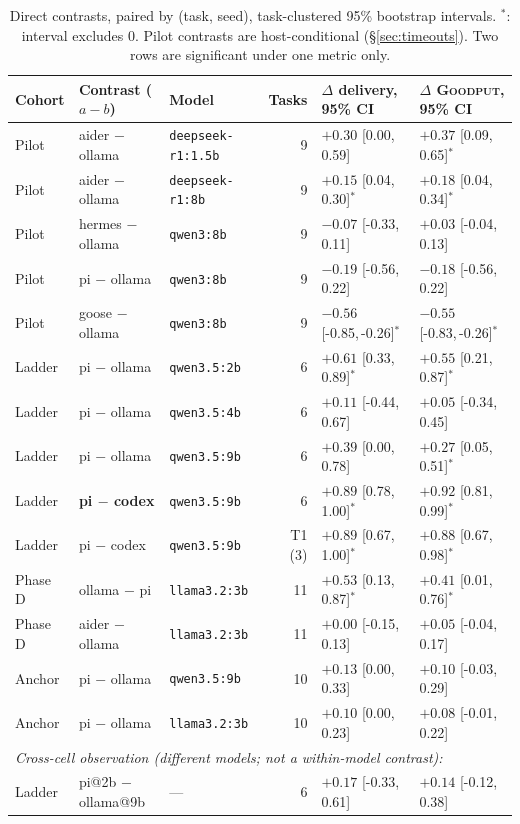 \documentclass[10pt]{article}
\newcommand{\goodput}{\textsc{Goodput}}
\newcommand{\ci}[2]{[#1,\,#2]}
\begin{document}
\begin{table}[t]
\centering\small
\begin{tabular}{lllrll}
\toprule
Cohort & Contrast ($a-b$) & Model & Tasks & $\Delta$ delivery, 95\% CI & $\Delta$ \goodput{}, 95\% CI\\
\midrule
Pilot & aider $-$ ollama & \texttt{deepseek-r1:1.5b} & 9 & $+0.30$ \ci{0.00}{0.59} & $+0.37$ \ci{0.09}{0.65}$^{*}$\\
Pilot & aider $-$ ollama & \texttt{deepseek-r1:8b} & 9 & $+0.15$ \ci{0.04}{0.30}$^{*}$ & $+0.18$ \ci{0.04}{0.34}$^{*}$\\
Pilot & hermes $-$ ollama & \texttt{qwen3:8b} & 9 & $-0.07$ \ci{-0.33}{0.11} & $+0.03$ \ci{-0.04}{0.13}\\
Pilot & pi $-$ ollama & \texttt{qwen3:8b} & 9 & $-0.19$ \ci{-0.56}{0.22} & $-0.18$ \ci{-0.56}{0.22}\\
Pilot & goose $-$ ollama & \texttt{qwen3:8b} & 9 & $-0.56$ \ci{-0.85}{-0.26}$^{*}$ & $-0.55$ \ci{-0.83}{-0.26}$^{*}$\\
\midrule
Ladder & pi $-$ ollama & \texttt{qwen3.5:2b} & 6 & $+0.61$ \ci{0.33}{0.89}$^{*}$ & $+0.55$ \ci{0.21}{0.87}$^{*}$\\
Ladder & pi $-$ ollama & \texttt{qwen3.5:4b} & 6 & $+0.11$ \ci{-0.44}{0.67} & $+0.05$ \ci{-0.34}{0.45}\\
Ladder & pi $-$ ollama & \texttt{qwen3.5:9b} & 6 & $+0.39$ \ci{0.00}{0.78} & $+0.27$ \ci{0.05}{0.51}$^{*}$\\
Ladder & \textbf{pi $-$ codex} & \texttt{qwen3.5:9b} & 6 & $\mathbf{+0.89}$ \ci{0.78}{1.00}$^{*}$ & $+0.92$ \ci{0.81}{0.99}$^{*}$\\
Ladder & pi $-$ codex & \texttt{qwen3.5:9b} & T1 (3) & $+0.89$ \ci{0.67}{1.00}$^{*}$ & $+0.88$ \ci{0.67}{0.98}$^{*}$\\
\midrule
Phase D & ollama $-$ pi & \texttt{llama3.2:3b} & 11 & $+0.53$ \ci{0.13}{0.87}$^{*}$ & $+0.41$ \ci{0.01}{0.76}$^{*}$\\
Phase D & aider $-$ ollama & \texttt{llama3.2:3b} & 11 & $+0.00$ \ci{-0.15}{0.13} & $+0.05$ \ci{-0.04}{0.17}\\
\midrule
Anchor & pi $-$ ollama & \texttt{qwen3.5:9b} & 10 & $+0.13$ \ci{0.00}{0.33} & $+0.10$ \ci{-0.03}{0.29}\\
Anchor & pi $-$ ollama & \texttt{llama3.2:3b} & 10 & $+0.10$ \ci{0.00}{0.23} & $+0.08$ \ci{-0.01}{0.22}\\
\midrule
\multicolumn{6}{l}{\emph{Cross-cell observation (different models; not a within-model contrast):}}\\
Ladder & pi@2b $-$ ollama@9b & --- & 6 & $+0.17$ \ci{-0.33}{0.61} & $+0.14$ \ci{-0.12}{0.38}\\
\bottomrule
\end{tabular}
\caption{Direct contrasts, paired by (task, seed), task-clustered 95\% bootstrap intervals.
$^{*}$: interval excludes 0. Pilot contrasts are host-conditional (\S\ref{sec:timeouts}). Two
rows are significant under one metric only.}
\label{tab:contrasts}
\end{table}
\end{document}
